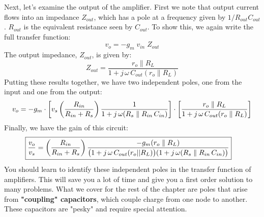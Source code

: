\newpage
\noindent
Next, let's examine the output of the amplifier.  First we note that output current flows into an impedance $Z_{out}$, which has a pole at a frequency given by $1/R_{out}C_{out}$. $R_{out}$ is the equivalent resistance seen by $C_{out}$.  To show this, we again write the full transfer function:
    \begin{equation}
        v_o = -g_m\;v_{in}\;Z_{out} 
    \end{equation}
The output impedance, $Z_{out}$, is given by:
    \begin{equation}
        Z_{out} = \frac{r_o \parallel R_L}{1 + j\,\omega\,C_{out}(r_o \parallel R_L)}
    \end{equation}
Putting these results together, we have two independent poles, one from the input and one from the output:
    \begin{equation}
        v_o = -g_m \cdot \left[v_s\left(\frac{R_{in}}{R_{in} + R_s}\right) \frac{1}{1 + j\,\omega(R_s \parallel R_{in}\,C_{in})}\right]
                    \cdot \left[\frac{r_o \parallel R_L}{1 + j\,\omega\,C_{out}(r_o \parallel R_L)}\right]\\[0.25cm]
    \end{equation}
Finally, we have the gain of this circuit:
    \begin{align}
        \Aboxed{\frac{v_o}{v_s}
        &= \left(\frac{R_{in}}{R_{in} + R_s}\right)
            \frac{-g_m(r_o \parallel R_L)}
                {\big(1 + j\,\omega\,C_{out}(r_o || R_L)\big)(1 + j\,\omega(R_s \parallel R_{in}\,C_{in})\big)}}
    \end{align}
You should learn to identify these independent poles in the transfer function of amplifiers.  This will save you a lot of time and give you a first order solution to many problems.  What we cover for the rest of the chapter are poles that arise from \textbf{"coupling" capacitors}, which couple charge from one node to another. These capacitors are "pesky" and require special attention.
